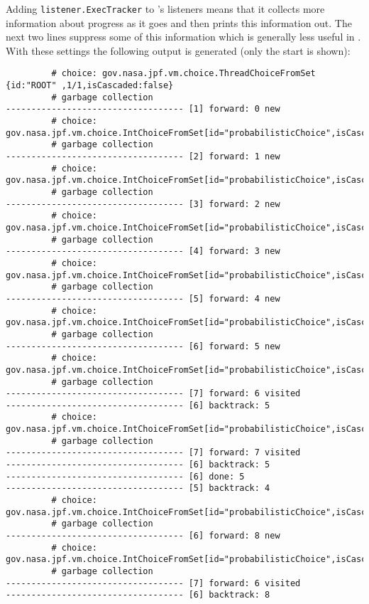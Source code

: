 Adding \texttt{listener.ExecTracker} to \jpf's listeners means that it collects more information about progress as it goes and then prints this information out.  The next two lines suppress some of this information which is generally less useful in \ajpf.  With these settings the following output is generated (only the start is shown):

\begin{small}
\begin{verbatim}
		 # choice: gov.nasa.jpf.vm.choice.ThreadChoiceFromSet {id:"ROOT" ,1/1,isCascaded:false}
		 # garbage collection
----------------------------------- [1] forward: 0 new
		 # choice: gov.nasa.jpf.vm.choice.IntChoiceFromSet[id="probabilisticChoice",isCascaded:false,>0,1]
		 # garbage collection
----------------------------------- [2] forward: 1 new
		 # choice: gov.nasa.jpf.vm.choice.IntChoiceFromSet[id="probabilisticChoice",isCascaded:false,>0,1]
		 # garbage collection
----------------------------------- [3] forward: 2 new
		 # choice: gov.nasa.jpf.vm.choice.IntChoiceFromSet[id="probabilisticChoice",isCascaded:false,>0,1]
		 # garbage collection
----------------------------------- [4] forward: 3 new
		 # choice: gov.nasa.jpf.vm.choice.IntChoiceFromSet[id="probabilisticChoice",isCascaded:false,>0,1]
		 # garbage collection
----------------------------------- [5] forward: 4 new
		 # choice: gov.nasa.jpf.vm.choice.IntChoiceFromSet[id="probabilisticChoice",isCascaded:false,>0,1]
		 # garbage collection
----------------------------------- [6] forward: 5 new
		 # choice: gov.nasa.jpf.vm.choice.IntChoiceFromSet[id="probabilisticChoice",isCascaded:false,>0,1]
		 # garbage collection
----------------------------------- [7] forward: 6 visited
----------------------------------- [6] backtrack: 5
		 # choice: gov.nasa.jpf.vm.choice.IntChoiceFromSet[id="probabilisticChoice",isCascaded:false,0,>1]
		 # garbage collection
----------------------------------- [7] forward: 7 visited
----------------------------------- [6] backtrack: 5
----------------------------------- [6] done: 5
----------------------------------- [5] backtrack: 4
		 # choice: gov.nasa.jpf.vm.choice.IntChoiceFromSet[id="probabilisticChoice",isCascaded:false,0,>1]
		 # garbage collection
----------------------------------- [6] forward: 8 new
		 # choice: gov.nasa.jpf.vm.choice.IntChoiceFromSet[id="probabilisticChoice",isCascaded:false,>0,1]
		 # garbage collection
----------------------------------- [7] forward: 6 visited
----------------------------------- [6] backtrack: 8
\end{verbatim}
\end{small}

